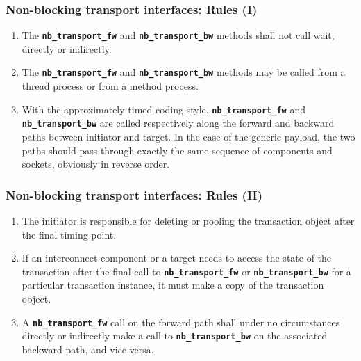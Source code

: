 {\begin{frame}
	\frametitle{Non-blocking transport interfaces: Rules (I)}
	\begin{enumerate}
		\item The \texttt{\textbf{nb\_transport\_fw}} and \texttt{\textbf{nb\_transport\_bw}} methods shall not call wait, directly or indirectly.
		\item The \texttt{\textbf{nb\_transport\_fw}} and \texttt{\textbf{nb\_transport\_bw}} methods may be called from a thread process or from a method process.
		\item With the approximately-timed coding style, \texttt{\textbf{nb\_transport\_fw}} and \texttt{\textbf{nb\_transport\_bw}} are called respectively along the forward and backward paths between initiator and target.
		In the case of the generic payload, the two paths should pass through exactly the same sequence of components and sockets, obviously in reverse order.
	\end{enumerate}
\end{frame}

\begin{frame}
	\frametitle{Non-blocking transport interfaces: Rules (II)}
	\begin{enumerate}
		\item The initiator is responsible for deleting or pooling the transaction object after the final timing point. 
		\item If an interconnect component or a target needs to access the state of the transaction after the final call to \texttt{\textbf{nb\_transport\_fw}} or \texttt{\textbf{nb\_transport\_bw}} for a particular transaction instance, it must make a copy of the transaction object.
		\item A \texttt{\textbf{nb\_transport\_fw}} call on the forward path shall under no circumstances directly or indirectly make a call to \texttt{\textbf{nb\_transport\_bw}} on the associated backward path, and vice versa.
	\end{enumerate}
\end{frame}

}
